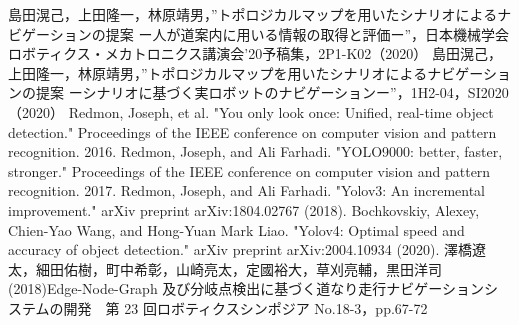 \documentclass[../main]{subfiles}
\begin{document}
\begin{thebibliography}{9}
 島田滉己，上田隆一，林原靖男，”トポロジカルマップを用いたシナリオによるナビゲーションの提案 ー人が道案内に用いる情報の取得と評価ー”，日本機械学会ロボティクス・メカトロニクス講演会'20予稿集，2P1-K02（2020）
 島田滉己，上田隆一，林原靖男，”トポロジカルマップを用いたシナリオによるナビゲーションの提案 ーシナリオに基づく実ロボットのナビゲーションー”，1H2-04，SI2020（2020）
Redmon, Joseph, et al. "You only look once: Unified, real-time object detection." Proceedings of the IEEE conference on computer vision and pattern recognition. 2016.
Redmon, Joseph, and Ali Farhadi. "YOLO9000: better, faster, stronger." Proceedings of the IEEE conference on computer vision and pattern recognition. 2017.
Redmon, Joseph, and Ali Farhadi. "Yolov3: An incremental improvement." arXiv preprint arXiv:1804.02767 (2018).
Bochkovskiy, Alexey, Chien-Yao Wang, and Hong-Yuan Mark Liao. "Yolov4: Optimal speed and accuracy of object detection." arXiv preprint arXiv:2004.10934 (2020).
澤橋遼太，細田佑樹，町中希彰，山崎亮太，定國裕大，草刈亮輔，黒田洋司(2018)Edge-Node-Graph 及び分岐点検出に基づく道なり走行ナビゲーションシステムの開発　第 23 回ロボティクスシンポジア No.18-3，pp.67-72
\end{thebibliography}
\end{document}
